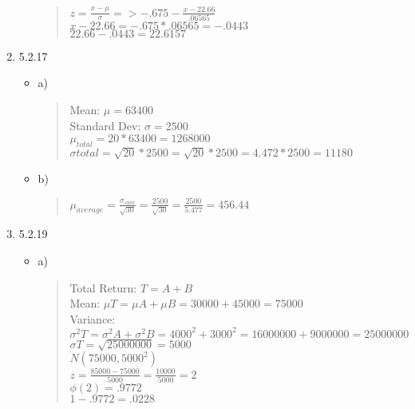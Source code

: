 \documentclass{article}
\begin{document}
\begin{enumerate}
\begin{itemize}
\begin{quote}
                $z = \frac{x - \mu}{\sigma} => -.675 - \frac{x-22.66}{.06565}$ \\
                $x-22.66 = -.675*.06565 = -.0443$ \\
                $22.66-.0443 = 22.6157$
            \end{quote}
        \end{itemize}
    \item 5.2.17     
        \begin{itemize}
            \item a)
            \begin{quote}
                Mean: $\mu = 63400$ \\
                Standard Dev: $\sigma = 2500$ \\
                $\mu_{total} = 20*63400 = 1268000$ \\
                $\sigma{total} = \sqrt{20}*2500 = \sqrt{20}*2500 = 4.472*2500 = 11180$
            \end{quote}
        \end{itemize}
        \begin{itemize}
            \item b)
            \begin{quote}
                $\mu_{average} = \frac{\sigma_{sum}}{\sqrt{30}} = \frac{2500}{\sqrt{30}} = \frac{2500}{5.477} = 456.44$
            \end{quote}
        \end{itemize}
    \item 5.2.19
        \begin{itemize}
            \item a)
            \begin{quote}
                Total Return: $T = A+B$ \\
                Mean: $\mu T = \mu A + \mu B = 30000+45000 = 75000$ \\
                Variance: $\sigma^{2}T = \sigma^{2}A+\sigma^{2}B = 4000^{2}+3000^{2} = 16000000+9000000 = 25000000$ \\
                $\sigma T = \sqrt{25000000} = 5000$ \\
                $N(75000, 5000^{2})$ \\
                $z = \frac{85000-75000}{5000} = \frac{10000}{5000} = 2$ \\
                $\phi(2) = .9772$ \\
                $1-.9772 = .0228$
            \end{quote}
        \end{itemize}
\end{enumerate}
\end{document}
